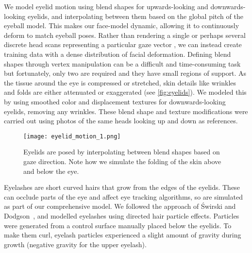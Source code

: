 We model eyelid motion using blend shapes for upwards-looking and downwards-looking eyelids, and interpolating between them based on the global pitch of the eyeball model.
This makes our face-model dynamic, allowing it to continuously deform to match eyeball poses.
Rather than rendering a single or perhaps several discrete head scans representing a particular gaze vector \cite{sugano2014learning}, we can instead create training data with a dense distribution of facial deformation.
Defining blend shapes through vertex manipulation can be a difficult and time-consuming task but fortunately, only two are required and they have small regions of support.
As the tissue around the eye is compressed or stretched, skin details like wrinkles and folds are either attenuated or exaggerated (see \autoref{fig:eyelids}).
We modeled this by using smoothed color and displacement textures for downwards-looking eyelids, removing any wrinkles.
These blend shape and texture modifications were carried out using photos of the same heads looking up and down as references.

\begin{figure}
    \texttt{[image: eyelid\_motion\_1.png]} \par \smallskip
    \caption{Eyelids are posed by interpolating between blend shapes based on gaze direction. Note how we simulate the folding of the skin above and below the eye.}
    \label{fig:eyelids}
\end{figure}

Eyelashes are short curved hairs that grow from the edges of the eyelids.
These can occlude parts of the eye and affect eye tracking algorithms, so are simulated as part of our comprehensive model.
We followed the approach of {\'S}wirski and Dodgson~\cite{swirski2014rendering}, and modelled eyelashes using directed hair particle effects.
Particles were generated from a control surface manually placed below the eyelids.
To make them curl, eyelash particles experienced a slight amount of gravity during growth (negative gravity for the upper eyelash).